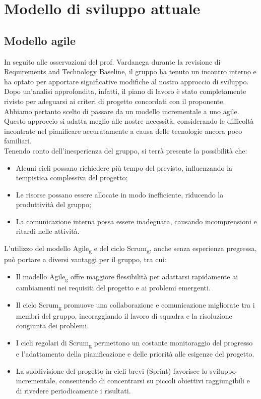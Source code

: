 \section{Modello di sviluppo attuale}
\subsection{Modello agile}
In seguito alle osservazioni del prof. Vardanega durante la revisione di Requirements and Technology Baseline, il gruppo ha tenuto un incontro interno e ha optato per apportare significative modifiche al nostro approccio di sviluppo. Dopo un'analisi approfondita, infatti, il piano di lavoro è stato completamente rivisto per adeguarsi ai criteri di progetto concordati con il proponente. \\
Abbiamo pertanto scelto di passare da un modello incrementale a uno agile. Questo approccio si adatta meglio alle nostre necessità, considerando le difficoltà incontrate nel pianificare accuratamente a causa delle tecnologie ancora poco familiari.\\

Tenendo conto dell'inesperienza del gruppo, si terrà presente la possibilità che:
\begin{itemize}
\item Alcuni cicli possano richiedere più tempo del previsto, influenzando la tempistica complessiva del progetto;
\item Le risorse possano essere allocate in modo inefficiente, riducendo la produttività del gruppo;
\item La comunicazione interna possa essere inadeguata, causando incomprensioni e ritardi nelle attività.
\end{itemize}

L'utilizzo del modello Agile\textsubscript{g} e del ciclo Scrum\textsubscript{g}, anche senza esperienza pregressa, può portare a diversi vantaggi per il gruppo, tra cui:
\begin{itemize}
\item Il modello Agile\textsubscript{g} offre maggiore flessibilità per adattarsi rapidamente ai cambiamenti nei requisiti del progetto e ai problemi emergenti.
\item Il ciclo Scrum\textsubscript{g} promuove una collaborazione e comunicazione migliorate tra i membri del gruppo, incoraggiando il lavoro di squadra e la risoluzione congiunta dei problemi.
\item I cicli regolari di Scrum\textsubscript{g} permettono un costante monitoraggio del progresso e l'adattamento della pianificazione e delle priorità alle esigenze del progetto.
\item La suddivisione del progetto in cicli brevi (Sprint) favorisce lo sviluppo incrementale, consentendo di concentrarsi su piccoli obiettivi raggiungibili e di rivedere periodicamente i risultati.
\end{itemize}

